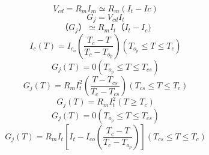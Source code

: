 \begin{equation}%
V_{cd}=R_mI_m\simeq R_m{(I_t-Ic)}
\end{equation}
\begin{equation}%
G_{j}=V_{cd}I_t
\end{equation}
\begin{equation}%
{（G_j）}\simeq R_{m}I_{t}{（I_t-I_c)}
\end{equation}
\begin{equation}%
I_c(T)=I_{c_o}(\frac{T_c-T}{T_c-T_{o_p}}) (T_{o_p}\leq T \leq T_c)
\end{equation}
\begin{equation}%
G_j(T)=0 (T_{o_p}\leq T \leq T_{cs})
\end{equation}
\begin{equation}%
G_j(T)=R_mI_t^2(\frac{T-T_{cs}}{T_c-T_{cs}})(T_{cs}\leq T\leq T_c)
\end{equation}
\begin{equation}%
G_j(T)=R_mI_t^2 (T\ge T_c)
\end{equation}
\begin{equation}%
G_j(T)=0 (T_{o_p}\leq T \leq T_{cs})
\end{equation}
\begin{equation}%
G_j(T)=R_mI_t[I_t-I_{co}(\frac{T_c-T}{T_c-T_{o_p}})] (T_{cs}\leq T\leq T_c)
\end{equation}

